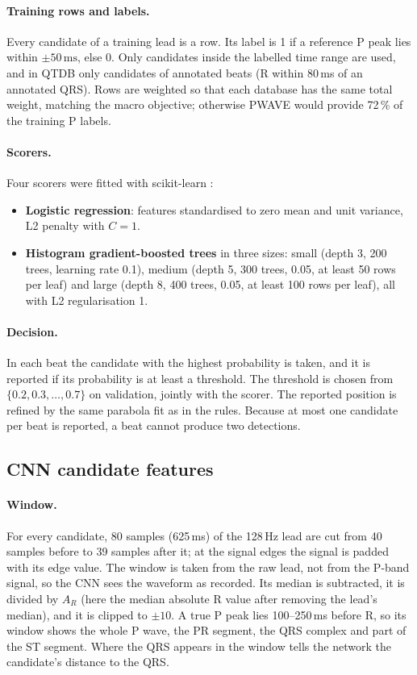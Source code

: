 \documentclass[11pt,a4paper]{article}
\newcommand{\ms}{\,\mathrm{ms}}
\begin{document}
\paragraph{Training rows and labels.} Every candidate of a training lead is a row. Its label is 1 if a reference P peak lies within $\pm50\ms$, else 0. Only candidates inside the labelled time range are used, and in QTDB only candidates of annotated beats (R within 80\,ms of an annotated QRS). Rows are weighted so that each database has the same total weight, matching the macro objective; otherwise PWAVE would provide 72\,\% of the training P labels.

\paragraph{Scorers.} Four scorers were fitted with scikit-learn \cite{sklearn}:
\begin{itemize}
\item \textbf{Logistic regression}: features standardised to zero mean and unit variance, L2 penalty with $C = 1$.
\item \textbf{Histogram gradient-boosted trees} in three sizes: small (depth 3, 200 trees, learning rate 0.1), medium (depth 5, 300 trees, 0.05, at least 50 rows per leaf) and large (depth 8, 400 trees, 0.05, at least 100 rows per leaf), all with L2 regularisation 1.
\end{itemize}

\paragraph{Decision.} In each beat the candidate with the highest probability is taken, and it is reported if its probability is at least a threshold. The threshold is chosen from $\{0.2, 0.3, \ldots, 0.7\}$ on validation, jointly with the scorer. The reported position is refined by the same parabola fit as in the rules. Because at most one candidate per beat is reported, a beat cannot produce two detections.

\subsection{CNN candidate features}

\paragraph{Window.} For every candidate, 80 samples (625\,ms) of the 128\,Hz lead are cut from 40 samples before to 39 samples after it; at the signal edges the signal is padded with its edge value. The window is taken from the raw lead, not from the P-band signal, so the CNN sees the waveform as recorded. Its median is subtracted, it is divided by $A_R$ (here the median absolute R value after removing the lead's median), and it is clipped to $\pm10$. A true P peak lies 100--250\,ms before R, so its window shows the whole P wave, the PR segment, the QRS complex and part of the ST segment. Where the QRS appears in the window tells the network the candidate's distance to the QRS.
\end{document}
